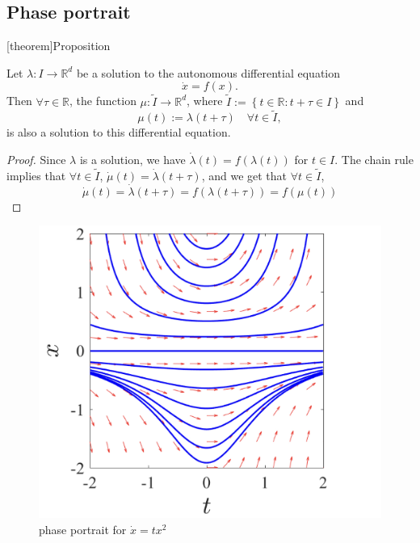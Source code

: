 \documentclass[12pt]{report}
\theoremstyle{definition}
\begin{document}
\subsection{Phase portrait}

[theorem]{Proposition}
\begin{translation invariance}
    Let $\lambda:I\rightarrow\mathbb{R}^{d}$ be a solution to the
    autonomous differential equation
    \[
        \dot{x}=f(x).
    \]
    Then $\forall \tau\in\mathbb{R}$, the function
    $\mu:\tilde{I}\rightarrow\mathbb{R}^{d}$, where
    $\tilde{I}:=\left\{t\in\mathbb{R}:t+\tau\in I\right\}$ and
    \[
        \mu(t):=\lambda(t+\tau) \quad \forall t\in\tilde{I},
    \]
    is also a solution to this differential equation.
\end{translation invariance}

\begin{proof}
    Since $\lambda$ is a solution, we have $\dot{\lambda}(t)=f(\lambda(t))$
    for $t\in I$. The chain rule implies that $\forall t\in\tilde{I}$,
    $\dot{\mu}(t)=\dot{\lambda}(t+\tau)$, and we get that $\forall t\in\tilde{I}$,
    \[
        \dot{\mu}(t)=\dot{\lambda}(t+\tau)=f(\lambda(t+\tau))=f(\mu(t))
    \]
\end{proof} 

\begin{figure}[h]
  	\includegraphics[scale=0.2]{./images/phase_portrait1.jpeg}
  	\centering
    \caption{phase portrait for $\dot{x}=tx^{2}$}
\end{figure}
\end{document}
